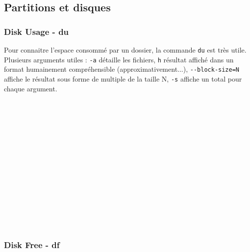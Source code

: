 

\newpage %
\subsection{Partitions et disques}

\subsubsection{Disk Usage - du}

\bigskip

Pour connaitre l'espace consommé par un dossier, la commande \texttt{du} est très utile.
Plusieurs arguments utiles : \texttt{-a} détaille les fichiers, \texttt{h} résultat affiché dans un format humainement compréhensible (approximativement...), \texttt{-{}-block-size=N} affiche le résultat sous forme de multiple de la taille N, \texttt{-s} affiche un total pour chaque argument.\\

\\
\\
\\
\\
\\
\\
\\
\\
\\
\\
\\
\\
\\
\\

\bigskip

\subsubsection{Disk Free - df}

\bigskip

